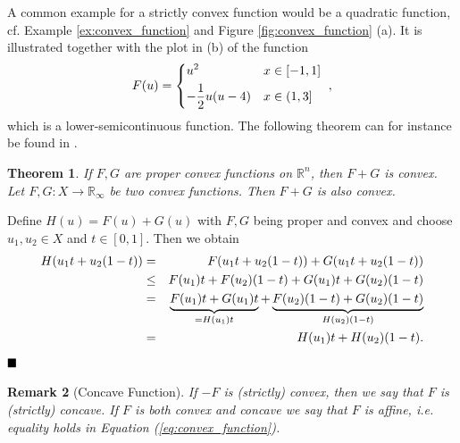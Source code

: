 \documentclass[abstracton]{scrreprt}
\newcommand{\qed}{$\hfill\blacksquare$}
\newtheorem{theorem}{Theorem}[chapter]
\newtheorem{remark}[theorem]{Remark}
\newenvironment{proof}[1][Proof]{\begin{trivlist}
\item[\hskip \labelsep {\bfseries #1}]}{\end{trivlist}}
\begin{document}
        A common example for a strictly convex function would be a quadratic function, cf. Example \ref{ex:convex_function} and Figure \ref{fig:convex_function} (a). It is illustrated together with the plot in (b) of the function
            \begin{equation}
                F(u) =
                    \begin{dcases*}
                        u^{2} & \textnormal{$x \in [-1, 1]$} \\
                        - \frac{1}{2} u(u - 4) & \textnormal{$x \in (1, 3]$}
                    \end{dcases*},
                \label{eq:lsc_example}
            \end{equation}
        which is a lower-semicontinuous function. The following theorem can for instance be found in \cite{Rockafellar}.
        \begin{theorem} %
            If $F, G$ are proper convex functions on $\mathbb{R}^{n}$, then $F + G$ is convex.
            Let $F, G: X \longrightarrow \mathbb{R}_{\infty}$ be two convex functions. Then $F + G$ is also convex.
        \end{theorem}
        \begin{proof} %
            Define $H(u) = F(u) + G(u)$ with $F, G$ being proper and convex and choose $u_{1}, u_{2} \in X$ and $t \in [0, 1]$. Then we obtain
            \begin{eqnarray}
                H(u_{1}t + u_{2}(1 - t)) &=& F(u_{1}t + u_{2}(1 - t)) + G(u_{1}t + u_{2}(1 - t)) \notag \\ 
                &\le& F(u_{1})t + F(u_{2})(1 - t) + G(u_{1})t + G(u_{2})(1 - t) \notag \\
                &=& \underbrace{F(u_{1})t + G(u_{1})t}_{= H(u_{1})t} + \underbrace{F(u_{2})(1 - t) + G(u_{2})(1 - t)}_{H(u_{2})(1 - t)} \notag \\
                &=& H(u_{1})t + H(u_{2})(1 - t). \notag
            \end{eqnarray}\qed
        \end{proof}
        \begin{remark}[Concave Function] %
            \label{rem:concave_function}
            If $-F$ is (strictly) convex, then we say that $F$ is (strictly) concave. If $F$ is both convex and concave we say that $F$ is affine, i.e. equality holds in Equation (\ref{eq:convex_function}).
        \end{remark}
\end{document}
